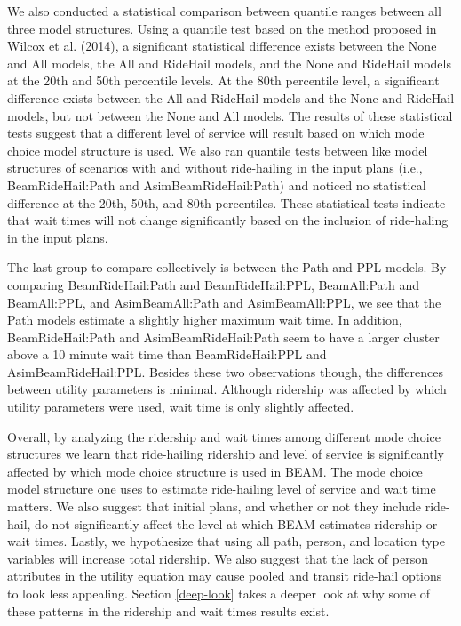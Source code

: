 \documentclass[simple, masters, twoside]{byuthesis}
\begin{document}
We also conducted a statistical comparison between quantile ranges between all three model structures. Using a quantile test based on the method proposed in Wilcox et al. (2014), a significant statistical difference exists between the None and All models, the All and RideHail models, and the None and RideHail models at the 20th and 50th percentile levels. At the 80th percentile level, a significant difference exists between the All and RideHail models and the None and RideHail models, but not between the None and All models. The results of these statistical tests suggest that a different level of service will result based on which mode choice model structure is used. We also ran quantile tests between like model structures of scenarios with and without ride-hailing in the input plans (i.e., BeamRideHail:Path and AsimBeamRideHail:Path) and noticed no statistical difference at the 20th, 50th, and 80th percentiles. These statistical tests indicate that wait times will not change significantly based on the inclusion of ride-haling in the input plans.

The last group to compare collectively is between the Path and PPL models. By comparing BeamRideHail:Path and BeamRideHail:PPL, BeamAll:Path and BeamAll:PPL, and AsimBeamAll:Path and AsimBeamAll:PPL, we see that the Path models estimate a slightly higher maximum wait time. In addition, BeamRideHail:Path and AsimBeamRideHail:Path seem to have a larger cluster above a 10 minute wait time than BeamRideHail:PPL and AsimBeamRideHail:PPL. Besides these two observations though, the differences between utility parameters is minimal. Although ridership was affected by which utility parameters were used, wait time is only slightly affected.

Overall, by analyzing the ridership and wait times among different mode choice structures we learn that ride-hailing ridership and level of service is significantly affected by which mode choice structure is used in BEAM. The mode choice model structure one uses to estimate ride-hailing level of service and wait time matters. We also suggest that initial plans, and whether or not they include ride-hail, do not significantly affect the level at which BEAM estimates ridership or wait times. Lastly, we hypothesize that using all path, person, and location type variables will increase total ridership. We also suggest that the lack of person attributes in the utility equation may cause pooled and transit ride-hail options to look less appealing. Section \ref{deep-look} takes a deeper look at why some of these patterns in the ridership and wait times results exist.
\end{document}
